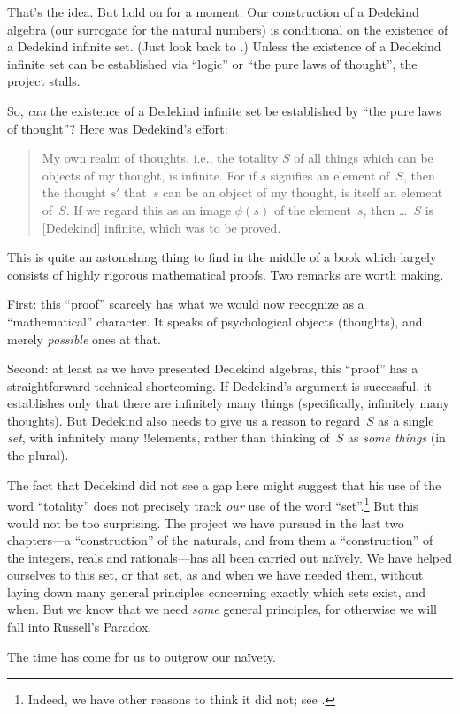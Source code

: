\documentclass[../../../include/open-logic-section]{subfiles}
\begin{document}
That's the idea. But hold on for a moment. Our construction of a
Dedekind algebra (our surrogate for the natural numbers) is
conditional on the existence of a Dedekind infinite set. (Just look
back to .)
Unless the existence of a Dedekind infinite set can be established via
``logic'' or ``the pure laws of thought'', the project stalls. 

So, \emph{can} the existence of a Dedekind infinite set be established
by ``the pure laws of thought''? Here was Dedekind's effort:
\begin{quote}
  My own realm of thoughts, i.e., the totality $S$ of all things which
  can be objects of my thought, is infinite. For if $s$ signifies an
  element of~$S$, then the thought $s'$ that~$s$ can be an object of
  my thought, is itself an element of~$S$. If we regard this as an
  image $\phi(s)$ of the element~$s$, then \dots~$S$ is [Dedekind]
  infinite, which was to be proved.
	\citep[\S66]{Dedekind1888}
\end{quote}
This is quite an astonishing thing to find in the middle of a book
which largely consists of highly rigorous mathematical proofs. Two
remarks are worth making. 

First: this ``proof'' scarcely has what we would now recognize as a
``mathematical'' character. It speaks of psychological objects
(thoughts), and merely \emph{possible} ones at that.

Second: at least as we have presented Dedekind algebras, this
``proof'' has a straightforward technical shortcoming. If Dedekind's
argument is successful, it establishes only that there are infinitely
many things (specifically, infinitely many thoughts). But Dedekind
also needs to give us a reason to regard~$S$ as a single \emph{set},
with infinitely many !!{element}s, rather than thinking of~$S$ as
\emph{some things} (in the plural). 

The fact that Dedekind did not see a gap here might suggest that his
use of the word ``totality'' does not precisely track \emph{our} use
of the word ``set''.\footnote{Indeed, we have other reasons to think
it did not; see \citet[p.~23]{Potter2004}.} But this would not be
too surprising. The project we have pursued in the last two
chapters---a ``construction'' of the naturals, and from them a
``construction'' of the integers, reals and rationals---has all been
carried out na\"ively. We have helped ourselves to this set, or that
set, as and when we have needed them, without laying down many general
principles concerning exactly which sets exist, and when. But we know
that we need \emph{some} general principles, for otherwise we will
fall into Russell's Paradox.

 The time has come for us to outgrow our na\"ivety. 
\end{document}
